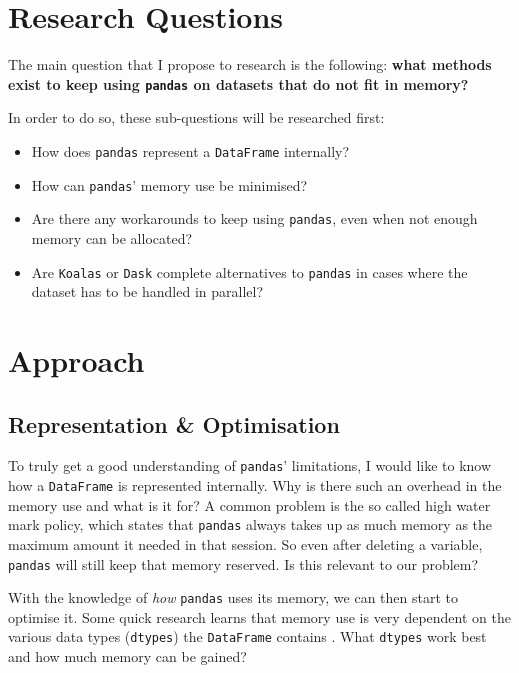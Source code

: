 \section{Research Questions}


The main question that I propose to research is the following: \textbf{what methods exist to keep using \texttt{pandas} on datasets that do not fit in memory?}

In order to do so, these sub-questions will be researched first:

\begin{itemize}
    \item How does \texttt{pandas} represent a \texttt{DataFrame} internally?
    \item How can \texttt{pandas}' memory use be minimised?
    \item Are there any workarounds to keep using \texttt{pandas}, even when not enough memory can be allocated?
    \item Are \texttt{Koalas} or \texttt{Dask} complete alternatives to \texttt{pandas} in cases where the dataset has to be handled in parallel?
\end{itemize}

\section{Approach}


\subsection{Representation \& Optimisation}

To truly get a good understanding of \texttt{pandas}' limitations, I would like to know how a \texttt{DataFrame} is represented internally. Why is there such an overhead in the memory use and what is it for? A common problem is the so called high water mark policy, which states that \texttt{pandas} always takes up as much memory as the maximum amount it needed in that session. So even after deleting a variable, \texttt{pandas} will still keep that memory reserved. Is this relevant to our problem?

With the knowledge of \textit{how} \texttt{pandas} uses its memory, we can then start to optimise it. Some quick research learns that memory use is very dependent on the various data types (\texttt{dtypes}) the \texttt{DataFrame} contains \cite[p.~833]{pandas_docs_mem}. What \texttt{dtypes} work best and how much memory can be gained?

